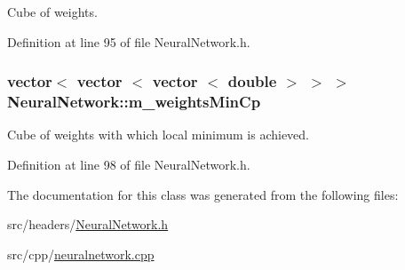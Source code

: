 Cube of weights. 



Definition at line 95 of file Neural\+Network.\+h.

\subsubsection[{\texorpdfstring{m\+\_\+weights\+Min\+Cp}{m_weightsMinCp}}]{\setlength{\rightskip}{0pt plus 5cm}vector$<$ vector $<$ vector $<$ double $>$ $>$ $>$ Neural\+Network\+::m\+\_\+weights\+Min\+Cp\hspace{0.3cm}{\ttfamily [protected]}}\hypertarget{classNeuralNetwork_a9ac6bc441d6e2bfe7521d0b23ac8efdb}{}\label{classNeuralNetwork_a9ac6bc441d6e2bfe7521d0b23ac8efdb}


Cube of weights with which local minimum is achieved. 



Definition at line 98 of file Neural\+Network.\+h.



The documentation for this class was generated from the following files\+:\begin{DoxyCompactItemize}
\item 
src/headers/\hyperlink{NeuralNetwork_8h}{Neural\+Network.\+h}\item 
src/cpp/\hyperlink{neuralnetwork_8cpp}{neuralnetwork.\+cpp}\end{DoxyCompactItemize}
